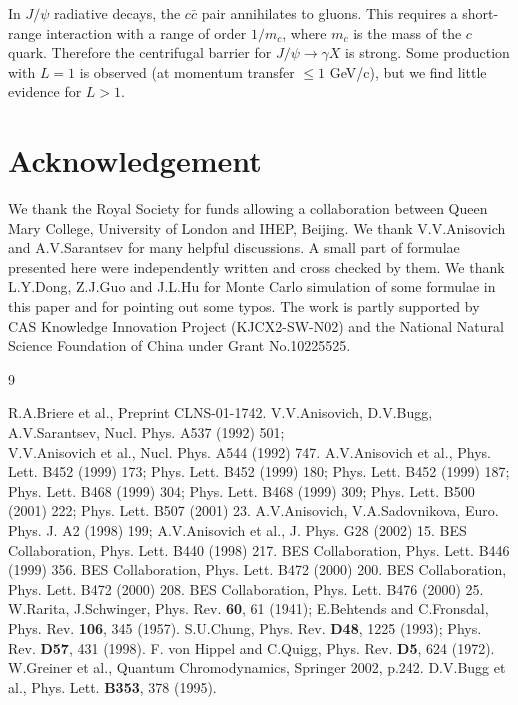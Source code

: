 In $J/\psi$ radiative decays, the $c\bar c$ pair annihilates to
gluons. This requires a short-range interaction with a range of
order $1/m_c$, where $m_c$ is the mass of the $c$ quark. Therefore
the centrifugal barrier for $J/\psi\to\gamma X$ is strong. Some
production with $L=1$ is observed (at momentum transfer $\leq 1$
GeV/c), but we find little evidence for $L>1$.


\section{Acknowledgement}

We thank the Royal Society for funds allowing a collaboration
between Queen Mary College, University of London and IHEP,
Beijing. We thank V.V.Anisovich and A.V.Sarantsev for many helpful
discussions. A small part of formulae presented here were
independently written and cross checked by them. We thank
L.Y.Dong, Z.J.Guo and J.L.Hu for Monte Carlo simulation of some
formulae in this paper and for pointing out some typos. The work
is partly supported by CAS Knowledge Innovation Project
(KJCX2-SW-N02) and the National Natural Science Foundation of
China under Grant No.10225525.

\begin{thebibliography}{9}

 R.A.Briere et al., Preprint CLNS-01-1742.
 V.V.Anisovich, D.V.Bugg, A.V.Sarantsev,
Nucl. Phys. A537 (1992) 501;\\ V.V.Anisovich et al., Nucl. Phys.
A544 (1992) 747.
 A.V.Anisovich et al., Phys. Lett. B452 (1999)
173; Phys. Lett. B452 (1999) 180; Phys. Lett. B452 (1999) 187;
Phys. Lett. B468 (1999) 304; Phys. Lett. B468 (1999) 309; Phys.
Lett. B500 (2001) 222; Phys. Lett. B507 (2001) 23.
 A.V.Anisovich, V.A.Sadovnikova, Euro. Phys.
J. A2 (1998) 199; A.V.Anisovich et al., J. Phys. G28 (2002) 15.
 BES Collaboration, Phys. Lett. B440 (1998) 217.
 BES Collaboration, Phys. Lett. B446 (1999) 356.
 BES Collaboration, Phys. Lett. B472 (2000) 200.
 BES Collaboration, Phys. Lett. B472 (2000) 208.
 BES Collaboration, Phys. Lett. B476 (2000) 25.
 W.Rarita, J.Schwinger, Phys. Rev. {\bf 60}, 61 (1941);
E.Behtends and C.Fronsdal, Phys. Rev. {\bf 106}, 345 (1957).
 S.U.Chung, Phys. Rev. {\bf D48}, 1225 (1993); Phys. Rev. {\bf D57},
431 (1998).
 F. von Hippel and C.Quigg, Phys. Rev. {\bf D5}, 624
(1972).
 W.Greiner et al., Quantum Chromodynamics, Springer 2002, p.242.
 D.V.Bugg et al., Phys. Lett. {\bf B353}, 378 (1995).
\end{thebibliography}


